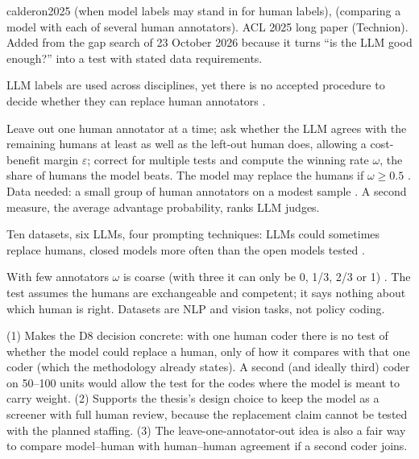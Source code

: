 \begin{papercard}{calderon2025}
  (when model labels may stand in for human labels),  (comparing a model with each of several human annotators). ACL 2025 long paper (Technion). Added from the gap search of 23 October 2026 because it turns ``is the LLM good enough?'' into a test with stated data requirements.

 LLM labels are used across disciplines, yet there is no accepted procedure to decide whether they can replace human annotators .

 Leave out one human annotator at a time; ask whether the LLM agrees with the remaining humans at least as well as the left-out human does, allowing a cost-benefit margin $\varepsilon$; correct for multiple tests and compute the winning rate $\omega$, the share of humans the model beats. The model may replace the humans if $\omega \geq 0.5$ . Data needed: a small group of human annotators on a modest sample . A second measure, the average advantage probability, ranks LLM judges.

 Ten datasets, six LLMs, four prompting techniques: LLMs could sometimes replace humans, closed models more often than the open models tested .

 With few annotators $\omega$ is coarse (with three it can only be 0, 1/3, 2/3 or 1) . The test assumes the humans are exchangeable and competent; it says nothing about which human is right. Datasets are NLP and vision tasks, not policy coding.

 (1) Makes the D8 decision concrete: with one human coder there is no test of whether the model could replace a human, only of how it compares with that one coder (which the methodology already states). A second (and ideally third) coder on 50--100 units would allow the test for the codes where the model is meant to carry weight. (2) Supports the thesis's design choice to keep the model as a screener with full human review, because the replacement claim cannot be tested with the planned staffing. (3) The leave-one-annotator-out idea is also a fair way to compare model--human with human--human agreement if a second coder joins.
\end{papercard}
